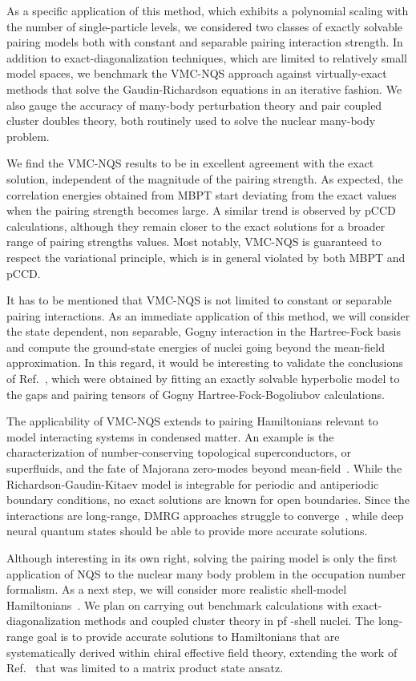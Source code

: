 \documentclass[aps,pre,floatfix,showpacs,twocolumn, preprintnumbers]{revtex4-1}
\begin{document}
As a specific application of this method, which exhibits a polynomial scaling with the number of single-particle levels, we considered two classes of exactly solvable pairing models both with constant and separable pairing interaction strength. In addition to exact-diagonalization techniques, which are limited to relatively small model spaces, we benchmark the VMC-NQS approach against virtually-exact methods that solve the Gaudin-Richardson equations in an iterative fashion. We also gauge the accuracy of many-body perturbation theory and pair coupled cluster doubles theory, both routinely used to solve the nuclear many-body problem.  

We find the VMC-NQS results to be in excellent agreement with the exact solution, independent of the magnitude of the pairing strength. As expected, the correlation energies obtained from MBPT start deviating from the exact values when the pairing strength becomes large. A similar trend is observed by pCCD calculations, although they remain closer to the exact solutions for a broader range of pairing strengths values. Most notably, VMC-NQS is guaranteed to respect the variational principle, which is in general violated by both MBPT and pCCD. 

It has to be mentioned that VMC-NQS is not limited to constant or separable pairing interactions. As an immediate application of this method, we will consider the state dependent, non separable, Gogny interaction in the Hartree-Fock basis and compute the ground-state energies of nuclei going beyond the mean-field approximation. In this regard, it would be interesting to validate the conclusions of Ref.~\cite{Dukelsky:2011nb}, which were obtained by fitting an exactly solvable hyperbolic model to the gaps and pairing tensors of Gogny Hartree-Fock-Bogoliubov calculations.

The applicability of VMC-NQS extends to pairing Hamiltonians relevant to model interacting systems in condensed matter. An example is the characterization of number-conserving topological superconductors, or superfluids, and the fate of Majorana zero-modes beyond mean-field~\cite{Ortiz:2014PhRvL}. While the Richardson-Gaudin-Kitaev model is integrable for periodic and antiperiodic boundary conditions, no exact solutions are known for open boundaries. Since the interactions are long-range, DMRG approaches struggle to converge~\cite{Iemini:2015PhRvL}, while deep neural quantum states should be able to provide more accurate solutions.

Although interesting in its own right, solving the pairing model is only the first application of NQS to the nuclear many body problem in the occupation number formalism. As a next step, we will consider more realistic shell-model Hamiltonians~\cite{hko95}. We plan on carrying out benchmark calculations with exact-diagonalization methods and coupled cluster theory in  pf -shell nuclei. The long-range goal is to provide accurate solutions to Hamiltonians that are systematically derived within chiral effective field theory, extending the work of Ref.~\cite{Tichai:2022bxr} that was limited to a matrix product state ansatz. 
\end{document}

